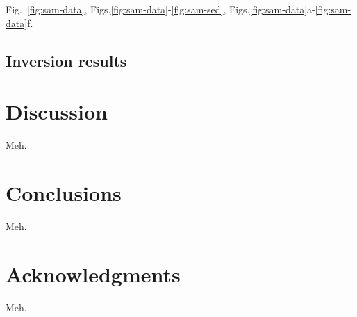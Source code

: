 \documentclass[extra]{gji}
\newcommand{\fig}[1]{Fig.~\ref{fig:#1}}
\newcommand{\figs}[2]{Figs.\ref{fig:#1}-\ref{fig:#2}}
\newcommand{\subfigs}[3]{Figs.\ref{fig:#1}#2-\ref{fig:#1}#3}
\begin{document}
\fig{sam-data}, \figs{sam-data}{sam-sed}, \subfigs{sam-data}{a}{f}.

\subsection{Inversion results}

\section{Discussion}

Meh.

\section{Conclusions}

Meh.

\section{Acknowledgments}

Meh.



\end{document}
